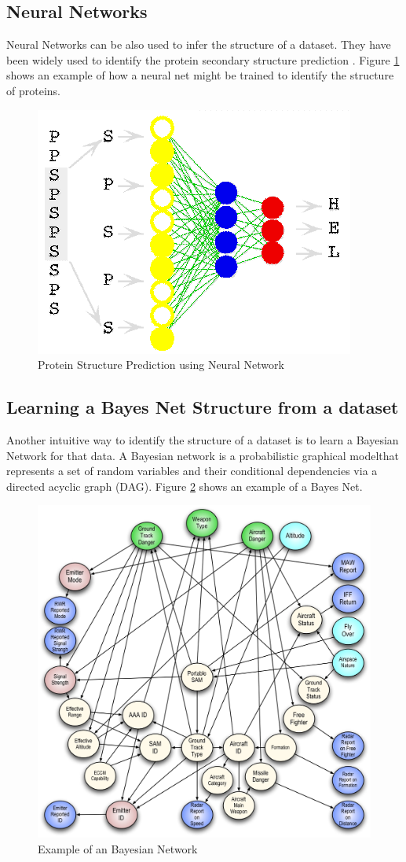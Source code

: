 \subsection{Neural Networks}

Neural Networks can be also used to infer the structure of a dataset. They have been widely used to identify the protein secondary structure prediction \cite{protein}.
Figure \ref{fig:Protein_structure_prediction_using_neural_nets} shows an example of how a neural net might be trained to identify the structure of proteins.
\begin{figure}[H]
	\centering
	\includegraphics[width=0.5\linewidth]{sections/imgs/techniques/protein.png}
	\caption{Protein Structure Prediction using Neural Network\cite{proteinPic}}
	\label{fig:Protein_structure_prediction_using_neural_nets}
\end{figure}

\subsection{Learning a Bayes Net Structure from a dataset}

Another intuitive way to identify the structure of a dataset is to learn a Bayesian Network for that data. A Bayesian network is a probabilistic graphical modelthat represents a set of random variables and their conditional dependencies via a directed acyclic graph (DAG). Figure \ref{fig:example_of_a_bayes_net} shows an example of a Bayes Net.
\begin{figure}[H]
	\centering
	\includegraphics[width=0.5\linewidth]{sections/imgs/techniques/bnn.jpg}
	\caption{Example of an Bayesian Network\cite{bnn}}
	\label{fig:example_of_a_bayes_net}
\end{figure}

